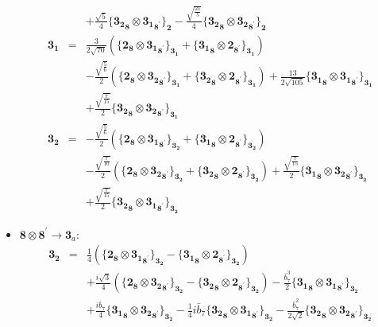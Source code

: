 \documentclass[english]{article}
\newcommand{\subcg}[3]{\big\{ {#1}\otimes{#2}\big\}^{}_{#3}}
\newcommand{\rep}[1]{\mathbf{#1}}
\begin{document}
\begin{itemize}
\begin{eqnarray*}
 & & +\frac{\sqrt{5}}{4}\subcg{\rep{3_2}_{\rep{8}}}{\rep{3_1}_{\rep{8}^{\prime}}}{\rep{2}}-\frac{\sqrt{\frac{21}{5}}}{4}\subcg{\rep{3_2}_{\rep{8}}}{\rep{3_2}_{\rep{8}^{\prime}}}{\rep{2}}
\\
\rep{3_1} &=& \frac{3}{2 \sqrt{70}}\left(\subcg{\rep{2}_{\rep{8}}}{\rep{3_1}_{\rep{8}^{\prime}}}{\rep{3_1}}+\subcg{\rep{3_1}_{\rep{8}}}{\rep{2}_{\rep{8}^{\prime}}}{\rep{3_1}}\right) \\ 
 & & -\frac{\sqrt{\frac{5}{6}}}{2}\left(\subcg{\rep{2}_{\rep{8}}}{\rep{3_2}_{\rep{8}^{\prime}}}{\rep{3_1}}+\subcg{\rep{3_2}_{\rep{8}}}{\rep{2}_{\rep{8}^{\prime}}}{\rep{3_1}}\right)+\frac{13}{2 \sqrt{105}}\subcg{\rep{3_1}_{\rep{8}}}{\rep{3_1}_{\rep{8}^{\prime}}}{\rep{3_1}} \\ 
 & & +\frac{\sqrt{\frac{7}{15}}}{2}\subcg{\rep{3_2}_{\rep{8}}}{\rep{3_2}_{\rep{8}^{\prime}}}{\rep{3_1}}
\\
\rep{3_2} &=& -\frac{\sqrt{\frac{5}{6}}}{2}\left(\subcg{\rep{2}_{\rep{8}}}{\rep{3_1}_{\rep{8}^{\prime}}}{\rep{3_2}}+\subcg{\rep{3_1}_{\rep{8}}}{\rep{2}_{\rep{8}^{\prime}}}{\rep{3_2}}\right) \\ 
 & & -\frac{\sqrt{\frac{7}{10}}}{2}\left(\subcg{\rep{2}_{\rep{8}}}{\rep{3_2}_{\rep{8}^{\prime}}}{\rep{3_2}}+\subcg{\rep{3_2}_{\rep{8}}}{\rep{2}_{\rep{8}^{\prime}}}{\rep{3_2}}\right)+\frac{\sqrt{\frac{7}{15}}}{2}\subcg{\rep{3_1}_{\rep{8}}}{\rep{3_2}_{\rep{8}^{\prime}}}{\rep{3_2}} \\ 
 & & +\frac{\sqrt{\frac{7}{15}}}{2}\subcg{\rep{3_2}_{\rep{8}}}{\rep{3_1}_{\rep{8}^{\prime}}}{\rep{3_2}}
\end{eqnarray*}
\item $\rep{8}\otimes\rep{8}^{\prime}\to\rep{3}_{a}$:
\begin{eqnarray*}
\rep{3_2} &=& \frac{1}{4}\left(\subcg{\rep{2}_{\rep{8}}}{\rep{3_1}_{\rep{8}^{\prime}}}{\rep{3_2}}-\subcg{\rep{3_1}_{\rep{8}}}{\rep{2}_{\rep{8}^{\prime}}}{\rep{3_2}}\right) \\ 
 & & +\frac{i \sqrt{3}}{4}\left(\subcg{\rep{2}_{\rep{8}}}{\rep{3_2}_{\rep{8}^{\prime}}}{\rep{3_2}}-\subcg{\rep{3_2}_{\rep{8}}}{\rep{2}_{\rep{8}^{\prime}}}{\rep{3_2}}\right)-\frac{\bar{b}_7^3}{2}\subcg{\rep{3_1}_{\rep{8}}}{\rep{3_1}_{\rep{8}^{\prime}}}{\rep{3_2}} \\ 
 & & +\frac{i \bar{b}_7}{4}\subcg{\rep{3_1}_{\rep{8}}}{\rep{3_2}_{\rep{8}^{\prime}}}{\rep{3_2}}-\frac{1}{4} i \bar{b}_7\subcg{\rep{3_2}_{\rep{8}}}{\rep{3_1}_{\rep{8}^{\prime}}}{\rep{3_2}}-\frac{\bar{b}_7^2}{2 \sqrt{2}}\subcg{\rep{3_2}_{\rep{8}}}{\rep{3_2}_{\rep{8}^{\prime}}}{\rep{3_2}}

\end{eqnarray*}
\end{itemize}
\end{document}
